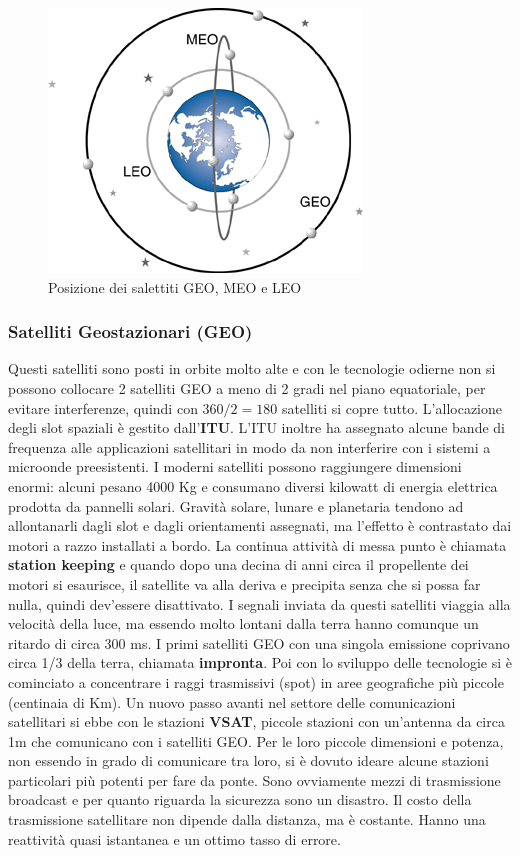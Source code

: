 \begin{figure}[htpb]
\centering
\includegraphics[scale=1]{images/Orbits.png}
\caption{Posizione dei salettiti GEO, MEO e LEO}
\end{figure}

\subsubsection{Satelliti Geostazionari (GEO)}	

Questi satelliti sono posti in orbite molto alte e con le tecnologie odierne non si possono collocare 2 satelliti GEO a meno di 2 gradi nel piano equatoriale, per evitare interferenze, quindi con $360/2=180$ satelliti si copre tutto. L'allocazione degli slot spaziali è gestito dall'\textbf{ITU}. L'ITU inoltre ha assegnato alcune bande di frequenza alle applicazioni satellitari in modo da non interferire con i sistemi a microonde preesistenti. 
I moderni satelliti possono raggiungere dimensioni enormi: alcuni pesano 4000 Kg e consumano diversi kilowatt di energia elettrica prodotta da pannelli solari. Gravità solare, lunare e planetaria tendono ad allontanarli dagli slot e dagli orientamenti assegnati, ma l'effetto è contrastato dai motori a razzo installati a bordo. La continua attività di messa punto è chiamata \textbf{station keeping} e quando dopo una decina di anni circa il propellente dei motori si esaurisce, il satellite va alla deriva e precipita senza che si possa far nulla, quindi dev'essere disattivato. 
\linebreak
\linebreak
I segnali inviata da questi satelliti viaggia alla velocità della luce, ma essendo molto lontani dalla terra hanno comunque un ritardo di circa 300 ms. I primi satelliti GEO con una singola emissione coprivano circa 1/3 della terra, chiamata \textbf{impronta}. Poi con lo sviluppo delle tecnologie si è cominciato a concentrare i raggi trasmissivi (spot) in aree geografiche più piccole (centinaia di Km). Un nuovo passo avanti nel settore delle comunicazioni satellitari si ebbe con le stazioni \textbf{VSAT}, piccole stazioni con un'antenna da circa 1m che comunicano con i satelliti GEO. Per le loro piccole dimensioni e potenza, non essendo in grado di comunicare tra loro, si è dovuto ideare alcune stazioni particolari più potenti per fare da ponte. Sono ovviamente mezzi di trasmissione broadcast e per quanto riguarda la sicurezza sono un disastro. Il costo della trasmissione satellitare non dipende dalla distanza, ma è costante. Hanno una reattività quasi istantanea e un ottimo tasso di errore.

